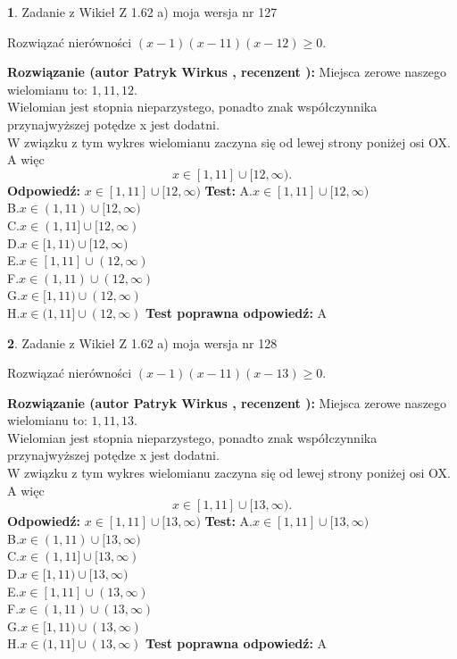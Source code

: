 \documentclass[12pt, a4paper]{article}
\theoremstyle{definition} %
\newtheorem{zad}{}
\newcommand{\zadStart}[1]{\begin{zad}#1\newline}
\newcommand{\zadStop}{\end{zad}}
\newcommand{\rozwStart}[2]{\noindent \textbf{Rozwiązanie (autor #1 , recenzent #2): }\newline}
\newcommand{\rozwStop}{\newline}
\newcommand{\odpStart}{\noindent \textbf{Odpowiedź:}\newline}
\newcommand{\odpStop}{\newline}
\newcommand{\testStart}{\noindent \textbf{Test:}\newline}
\newcommand{\testStop}{\newline}
\newcommand{\kluczStart}{\noindent \textbf{Test poprawna odpowiedź:}\newline}
\newcommand{\kluczStop}{\newline}
\begin{document}
\zadStart{Zadanie z Wikieł Z 1.62 a) moja wersja nr 127}

Rozwiązać nierówności $(x-1)(x-11)(x-12)\ge0$.
\zadStop
\rozwStart{Patryk Wirkus}{}
Miejsca zerowe naszego wielomianu to: $1, 11, 12$.\\
Wielomian jest stopnia nieparzystego, ponadto znak współczynnika przy\linebreak najwyższej potędze x jest dodatni.\\ W związku z tym wykres wielomianu zaczyna się od lewej strony poniżej osi OX. A więc $$x \in [1,11] \cup [12,\infty).$$
\rozwStop
\odpStart
$x \in [1,11] \cup [12,\infty)$
\odpStop
\testStart
A.$x \in [1,11] \cup [12,\infty)$\\
B.$x \in (1,11) \cup [12,\infty)$\\
C.$x \in (1,11] \cup [12,\infty)$\\
D.$x \in [1,11) \cup [12,\infty)$\\
E.$x \in [1,11] \cup (12,\infty)$\\
F.$x \in (1,11) \cup (12,\infty)$\\
G.$x \in [1,11) \cup (12,\infty)$\\
H.$x \in (1,11] \cup (12,\infty)$
\testStop
\kluczStart
A
\kluczStop



\zadStart{Zadanie z Wikieł Z 1.62 a) moja wersja nr 128}

Rozwiązać nierówności $(x-1)(x-11)(x-13)\ge0$.
\zadStop
\rozwStart{Patryk Wirkus}{}
Miejsca zerowe naszego wielomianu to: $1, 11, 13$.\\
Wielomian jest stopnia nieparzystego, ponadto znak współczynnika przy\linebreak najwyższej potędze x jest dodatni.\\ W związku z tym wykres wielomianu zaczyna się od lewej strony poniżej osi OX. A więc $$x \in [1,11] \cup [13,\infty).$$
\rozwStop
\odpStart
$x \in [1,11] \cup [13,\infty)$
\odpStop
\testStart
A.$x \in [1,11] \cup [13,\infty)$\\
B.$x \in (1,11) \cup [13,\infty)$\\
C.$x \in (1,11] \cup [13,\infty)$\\
D.$x \in [1,11) \cup [13,\infty)$\\
E.$x \in [1,11] \cup (13,\infty)$\\
F.$x \in (1,11) \cup (13,\infty)$\\
G.$x \in [1,11) \cup (13,\infty)$\\
H.$x \in (1,11] \cup (13,\infty)$
\testStop
\kluczStart
A
\kluczStop
\end{document}
